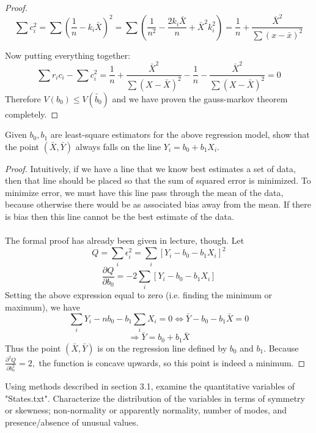 \documentclass[12pt]{article}
\newenvironment{problem}[2][Problem]{\begin{trivlist}
\item[\hskip \labelsep {\bfseries #1}\hskip \labelsep {\bfseries #2.}]}{\end{trivlist}}
\begin{document}
\begin{proof}
$$\sum c_i^2 = \sum (\frac{1}{n} - k_i \bar{X})^2 = \sum (\frac{1}{n^2} - \frac{2k_i\bar{X}}{n} + \bar{X}^2k_i^2) = \frac{1}{n} + \frac{\bar{X}^2}{\sum(x-\bar{x})^2}$$

Now putting everything together:
$$\sum r_ic_i - \sum c_i^2 = \frac{1}{n} + \frac{\bar{X}^2}{\sum(X-\bar{X})^2} - \frac{1}{n} - \frac{\bar{X}^2}{\sum(X-\bar{X})^2} = 0$$
Therefore $V(b_0) \leq V(\widetilde{b_0})$ and we have proven the gauss-markov theorem completely.
\end{proof}

\begin{problem}{2}
Given $b_0, b_1$ are least-square estimators for the above regression model, show that the point $(\bar{X}, \bar{Y})$ always falls on the line $Y_i = b_0 + b_1X_i.$
\end{problem}

\begin{proof}
Intuitively, if we have a line that we know best estimates a set of data, then that line should be placed so that the sum of squared error is minimized. To minimize error, we must have this line pass through the mean of the data, because otherwise there would be as associated bias away from the mean. If there is bias then this line cannot be the best estimate of the data.\\ 
\\
The formal proof has already been given in lecture, though. Let
$$Q = \sum_i \epsilon_i^2 = \sum_i [Y_i - b_0 - b_1X_i]^2$$
$$\frac{\partial Q}{\partial b_0} = -2\sum_i [Y_i - b_0 - b_1X_i]$$
Setting the above expression equal to zero (i.e. finding the minimum or maximum), we have 
$$\sum_i Y_i - nb_0 - b_1\sum_i X_i = 0 \iff \bar{Y} - b_0 - b_1 \bar{X} = 0$$
$$\Rightarrow \bar{Y} = b_0 + b_1\bar{X}$$
Thus the point $(\bar{X}, \bar{Y})$ is on the regression line defined by $b_0$ and $b_1$. Because $\frac{\partial^2 Q}{\partial b_0^2} = 2,$ the function is concave upwards, so this point is indeed a minimum. 
\end{proof}

\begin{problem}{4}
Using methods described in section 3.1, examine the quantitative variables of "States.txt". Characterize the distribution of the variables in terms of symmetry or skewness; non-normality or apparently normality, number of modes, and presence/absence of unusual values. 
\end{problem}
\end{document}
